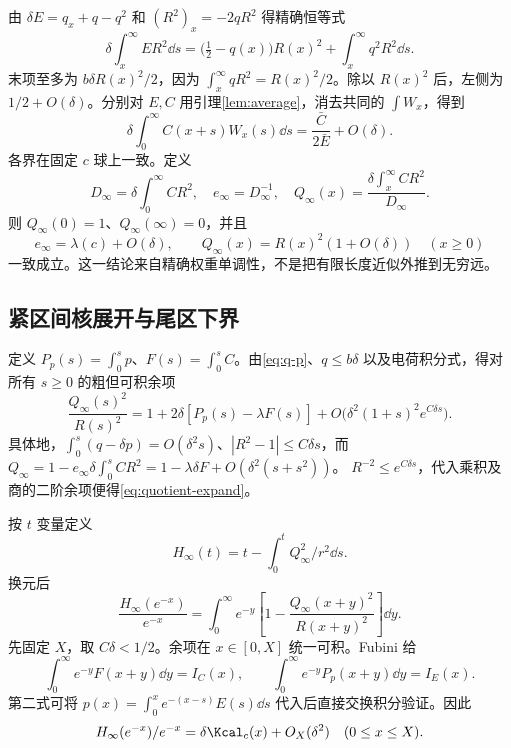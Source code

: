 由 $\delta E=q_x+q-q^2$ 和 $(R^2)_x=-2qR^2$ 得精确恒等式
\begin{equation}\label{eq:infinite-energy}
\delta\int_x^\infty ER^2\dd s
=\bigl(\tfrac12-q(x)\bigr)R(x)^2+\int_x^\infty q^2R^2\dd s.
\end{equation}
末项至多为 $b\delta R(x)^2/2$，因为 $\int_x^\infty qR^2=R(x)^2/2$。除以 $R(x)^2$ 后，左侧为 $1/2+O(\delta)$。分别对 $E,C$ 用引理\ref{lem:average}，消去共同的 $\int W_x$，得到
\begin{equation}\label{eq:Caverage}
\delta\int_0^\infty C(x+s)W_x(s)\dd s
=\frac{\bar C}{2\bar E}+O(\delta).
\end{equation}
各界在固定 $c$ 球上一致。定义
\begin{equation}\label{eq:Qinf}
D_\infty=\delta\int_0^\infty CR^2,\quad e_\infty=D_\infty^{-1},\quad
Q_\infty(x)=\frac{\delta\int_x^\infty CR^2}{D_\infty}.
\end{equation}
则 $Q_\infty(0)=1$、$Q_\infty(\infty)=0$，并且
\begin{equation}\label{eq:Quniform}
e_\infty=\lambda(c)+O(\delta),\qquad
Q_\infty(x)=R(x)^2(1+O(\delta))\quad(x\ge0)
\end{equation}
一致成立。这一结论来自精确权重单调性，不是把有限长度近似外推到无穷远。

\subsection{紧区间核展开与尾区下界}
定义 $P_p(s)=\int_0^sp$、$F(s)=\int_0^sC$。由\eqref{eq:q-p}、$q\le b\delta$ 以及电荷积分式，得对所有 $s\ge0$ 的粗但可积余项
\begin{equation}\label{eq:quotient-expand}
\frac{Q_\infty(s)^2}{R(s)^2}
=1+2\delta[P_p(s)-\lambda F(s)]
+O\bigl(\delta^2(1+s)^2e^{C\delta s}\bigr).
\end{equation}
具体地，$\int_0^s(q-\delta p)=O(\delta^2s)$、$|R^2-1|\le C\delta s$，而
$Q_\infty=1-e_\infty\delta\int_0^sCR^2
=1-\lambda\delta F+O(\delta^2(s+s^2))$。
$R^{-2}\le e^{C\delta s}$，代入乘积及商的二阶余项便得\eqref{eq:quotient-expand}。

按 $t$ 变量定义
\[
H_\infty(t)=t-\int_0^tQ_\infty^2/r^2\dd s.
\]
换元后
\begin{equation}\label{eq:Hinf}
\frac{H_\infty(e^{-x})}{e^{-x}}
=\int_0^\infty e^{-y}
\left[1-\frac{Q_\infty(x+y)^2}{R(x+y)^2}\right]\dd y.
\end{equation}
先固定 $X$，取 $C\delta<1/2$。余项在 $x\in[0,X]$ 统一可积。Fubini 给
\[
\int_0^\infty e^{-y}F(x+y)\dd y=I_C(x),\qquad
\int_0^\infty e^{-y}P_p(x+y)\dd y=I_E(x).
\]
第二式可将 $p(x)=\int_0^xe^{-(x-s)}E(s)\dd s$ 代入后直接交换积分验证。因此
\begin{equation}\label{eq:HK}
H_\infty(e^{-x})/e^{-x}=\delta\Kcal_c(x)+O_X(\delta^2)
\quad(0\le x\le X).
\end{equation}

